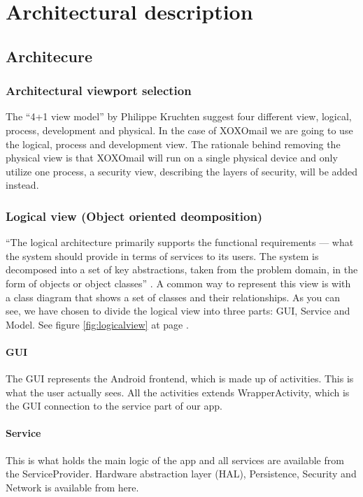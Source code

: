 \chapter{Architectural description}

\section{Architecure}

\subsection{Architectural viewport selection}
The “4+1 view model” \cite{bib:vm} by Philippe Kruchten suggest four different view, logical, process, development and physical. In the case of XOXOmail we are going to use the logical, process and development view. The rationale behind removing the physical view is that XOXOmail will run on a single physical device and only utilize one process, a security view, describing the layers of security, will be added instead.

\subsection{Logical view (Object oriented deomposition)}
“The logical architecture primarily supports the functional requirements --- what the system should provide in terms of services to its users. The system is decomposed into a set of key abstractions, taken from the problem domain, in the form of objects or object classes” \cite{bib:vm}. A common way to represent this view is with a class diagram that shows a set of classes and their relationships. As you can see, we have chosen to divide the logical view into three parts: GUI, Service and Model. 
See figure \ref{fig:logicalview} at page \pageref{fig:logicalview}.

\subsubsection{GUI}
The GUI represents the Android frontend, which is made up of activities. This is what the user actually sees. All the activities extends WrapperActivity, which is the GUI connection to the service part of our app.

\subsubsection{Service}
 This is what holds the main logic of the app and all services are available from the ServiceProvider. Hardware abstraction layer (HAL), Persistence, Security and Network is available from here. 

